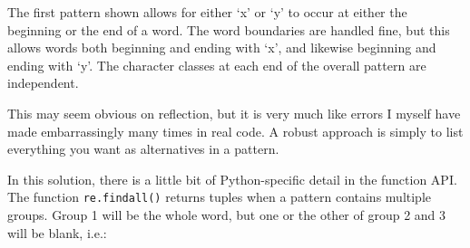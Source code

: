 The first pattern shown allows for either `x' or `y' to occur at either
the beginning or the end of a word. The word boundaries are handled
fine, but this allows words both beginning and ending with `x', and
likewise beginning and ending with `y'. The character classes at each
end of the overall pattern are independent.

This may seem obvious on reflection, but it is very much like errors I
myself have made embarrassingly many times in real code. A robust
approach is simply to list everything you want as alternatives in a
pattern.

\begin{Shaded}
\begin{Highlighting}[]
\OperatorTok{\textgreater{}\textgreater{}\textgreater{}}\OperatorTok{=}\NormalTok{(}\NormalTok{)}
\OperatorTok{\textgreater{}\textgreater{}\textgreater{}}\NormalTok{ [m[}\NormalTok{] }\NormalTok{ re.findall(pat7, txt)]}
\NormalTok{[}\NormalTok{, }\NormalTok{, }\NormalTok{, }\NormalTok{, }\NormalTok{]}
\end{Highlighting}
\end{Shaded}

In this solution, there is a little bit of Python-specific detail in the
function API. The function \texttt{re.findall()} returns tuples when a
pattern contains multiple groups. Group 1 will be the whole word, but
one or the other of group 2 and 3 will be blank, i.e.:

